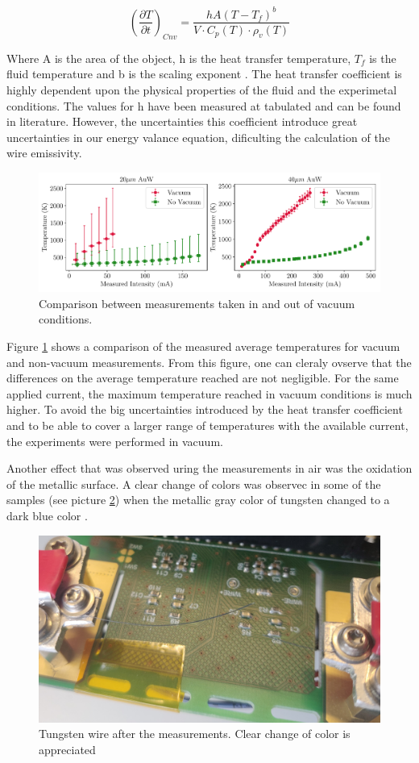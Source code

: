 \begin{equation}
    \left(\frac{\partial T}{\partial t}\right)_{Cnv} = \frac{hA\left(T - T_{f} \right)^{b}}{V\cdot C_{p}(T)\cdot \rho_v(T)}
\end{equation}

Where A is the area of the object, h is the heat transfer temperature, $T_f$ is the fluid temperature and b is the scaling exponent \parencite[][]{ref:Convection}. The heat transfer coefficient is highly dependent upon the physical properties of the fluid and the experimetal conditions. The values for h have been measured at tabulated and can be found in literature. However, the uncertainties this coefficient introduce great uncertainties in our energy valance equation, dificulting the calculation of the wire emissivity. 

\begin{figure}[h]
    \centering
    \includegraphics[width=1.0\columnwidth]{Figure_ConvVSnoConv/ConvNotConv.pdf}
    \caption{Comparison between measurements taken in and out of vacuum conditions. }
    \label{fig:ConvectionEffect}
\end{figure}

Figure \ref{fig:ConvectionEffect} shows a comparison of the measured average temperatures for vacuum and non-vacuum measurements. From this figure, one can cleraly ovserve that the differences on the average temperature reached are not negligible. For the same applied current, the maximum temperature reached in vacuum conditions is much higher. To avoid the big uncertainties introduced by the heat transfer coefficient and to be able to cover a larger range of temperatures with the available current, the experiments were performed in vacuum. 

Another effect that was observed uring the measurements in air was the oxidation of the metallic surface. A clear change of colors was observec in some of the samples (see picture \ref{fig:Oxidation}) when the metallic gray color of tungsten changed to a dark blue color \parencite[][]{ref:CiteOxidation}.

\begin{figure}[h]
    \centering
    \includegraphics[width=0.7\columnwidth]{Figure_ColorChange/PictureWire.jpg}
    \caption{Tungsten wire after the measurements. Clear change of color is appreciated}
    \label{fig:Oxidation}
\end{figure}